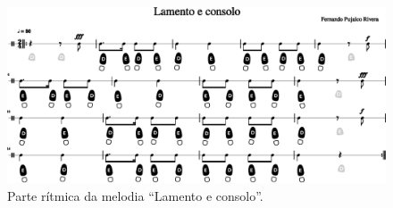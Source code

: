 \begin{figure}
    \centering
    \includegraphics[width=\textwidth]{chapters/cap-musicalidade-tecnica/lamento-e-consolo-clave-ritmo2-1.eps}
    \caption{Parte rítmica da melodia ``Lamento e consolo''.}
    \label{fig:lamentoconsoloritmo2}
\end{figure}

